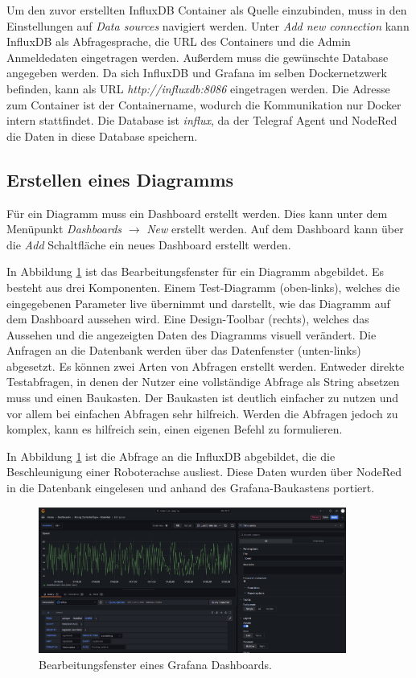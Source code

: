 \documentclass[a4paper, 12pt, oneside, toc=listofnumbered, bibliography=totoc]{scrbook}
\begin{document}
		Um den zuvor erstellten InfluxDB Container als Quelle einzubinden, muss in den Einstellungen auf \textit{Data sources} navigiert werden. Unter \textit{Add new connection} kann InfluxDB als Abfragesprache, die URL des Containers und die Admin Anmeldedaten eingetragen werden. Außerdem muss die gewünschte Database angegeben werden. Da sich InfluxDB und Grafana im selben Dockernetzwerk befinden, kann als URL \textit{http://influxdb:8086} eingetragen werden. Die Adresse zum Container ist der Containername, wodurch die Kommunikation nur Docker intern stattfindet. Die Database ist \textit{influx}, da der Telegraf Agent und NodeRed die Daten in diese Database speichern.
		
		
		\subsection{Erstellen eines Diagramms}
		
		Für ein Diagramm muss ein Dashboard erstellt werden. Dies kann unter dem Menüpunkt \textit{Dashboards} $\rightarrow$ \textit{New} erstellt werden. Auf dem Dashboard kann über die \textit{Add} Schaltfläche ein neues Dashboard erstellt werden.
		
		In Abbildung \ref{fig:GrafanaDiagramm} ist das Bearbeitungsfenster für ein Diagramm abgebildet. Es besteht aus drei Komponenten. Einem Test-Diagramm (oben-links), welches die eingegebenen Parameter live übernimmt und darstellt, wie das Diagramm auf dem Dashboard aussehen wird. Eine Design-Toolbar (rechts), welches das Aussehen und die angezeigten Daten des Diagramms visuell verändert. Die Anfragen an die Datenbank werden über das Datenfenster (unten-links) abgesetzt. Es können zwei Arten von Abfragen erstellt werden. Entweder direkte Testabfragen, in denen der Nutzer eine vollständige Abfrage als String absetzen muss und einen Baukasten. Der Baukasten ist deutlich einfacher zu nutzen und vor allem bei einfachen Abfragen sehr hilfreich. Werden die Abfragen jedoch zu komplex, kann es hilfreich sein, einen eigenen Befehl zu formulieren.
		
		In Abbildung \ref{fig:GrafanaDiagramm} ist die Abfrage an die InfluxDB abgebildet, die die Beschleunigung einer Roboterachse ausliest. Diese Daten wurden über NodeRed in die Datenbank eingelesen und anhand des Grafana-Baukastens portiert. 
		
		\begin{figure}[H]
			\centering
			\includegraphics[width=0.9\textwidth]{res/Grafana-Diagramm.png}
			\caption{Bearbeitungsfenster eines Grafana Dashboards.}
			\label{fig:GrafanaDiagramm}
		\end{figure}
	
\end{document}
